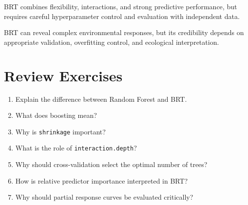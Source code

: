 BRT combines flexibility, interactions, and strong predictive performance, but
requires careful hyperparameter control and evaluation with independent data.

\begin{conceito}[title={\faBook\quad Key message}]
BRT can reveal complex environmental responses, but its credibility depends on
appropriate validation, overfitting control, and ecological interpretation.
\end{conceito}

\section{Review Exercises}
\begin{enumerate}
  \item Explain the difference between Random Forest and BRT.
  \item What does boosting mean?
  \item Why is \texttt{shrinkage} important?
  \item What is the role of \texttt{interaction.depth}?
  \item Why should cross-validation select the optimal number of trees?
  \item How is relative predictor importance interpreted in BRT?
  \item Why should partial response curves be evaluated critically?
\end{enumerate}
